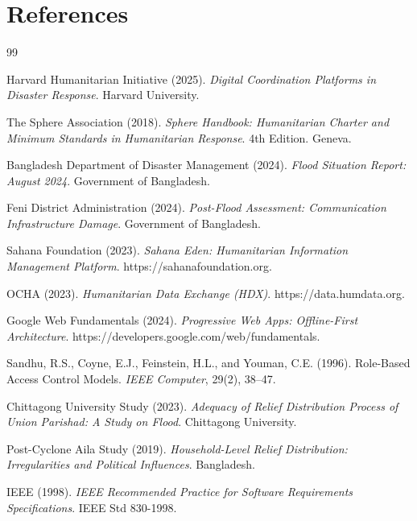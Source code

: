 \chapter*{References}

\begin{thebibliography}{99}

Harvard Humanitarian Initiative (2025). \textit{Digital Coordination Platforms in Disaster Response}. Harvard University.

The Sphere Association (2018). \textit{Sphere Handbook: Humanitarian Charter and Minimum Standards in Humanitarian Response}. 4th Edition. Geneva.

Bangladesh Department of Disaster Management (2024). \textit{Flood Situation Report: August 2024}. Government of Bangladesh.

Feni District Administration (2024). \textit{Post-Flood Assessment: Communication Infrastructure Damage}. Government of Bangladesh.

Sahana Foundation (2023). \textit{Sahana Eden: Humanitarian Information Management Platform}. https://sahanafoundation.org.

OCHA (2023). \textit{Humanitarian Data Exchange (HDX)}. https://data.humdata.org.

Google Web Fundamentals (2024). \textit{Progressive Web Apps: Offline-First Architecture}. https://developers.google.com/web/fundamentals.

Sandhu, R.S., Coyne, E.J., Feinstein, H.L., and Youman, C.E. (1996). Role-Based Access Control Models. \textit{IEEE Computer}, 29(2), 38--47.

Chittagong University Study (2023). \textit{Adequacy of Relief Distribution Process of Union Parishad: A Study on Flood}. Chittagong University.

Post-Cyclone Aila Study (2019). \textit{Household-Level Relief Distribution: Irregularities and Political Influences}. Bangladesh.

IEEE (1998). \textit{IEEE Recommended Practice for Software Requirements Specifications}. IEEE Std 830-1998.


\end{thebibliography}

